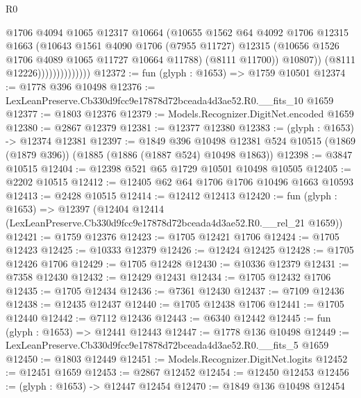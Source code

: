 \begin{lexlean}{R0}
\begin{coremodule}
                                @1706
                                @4094
                                @1065
                                @12317
                                @10664
                                (@10655
                                  @1562
                                  @64
                                  @4092
                                  @1706
                                  @12315
                                  @1663
                                  (@10643
                                    @1561
                                    @4090
                                    @1706
                                    (@7955 @11727)
                                    @12315
                                    (@10656 @1526 @1706 @4089 @1065 @11727 @10664 @11788)
                                    (@8111 @11700))
                                  @10807))
                              (@8111 @12226))))))))))))))
@12372 := fun (glyph : @1653) => @1759 @10501
@12374 := @1778 @396 @10498
@12376 := LexLeanPreserve.Cb330d9fcc9e17878d72bceada4d3ae52.R0.__fits_10 @1659
@12377 := @1803 @12376
@12379 := Models.Recognizer.DigitNet.encoded @1659
@12380 := @2867 @12379
@12381 := @12377 @12380
@12383 := (glyph : @1653) -> @12374 @12381
@12397 := @1849
    @396
    @10498
    @12381
    @524
    @10515
    (@1869 (@1879 @396))
    (@1885 (@1886 (@1887 @524) @10498 @1863))
@12398 := @3847 @10515
@12404 := @12398 @521 @65 @1729 @10501 @10498 @10505
@12405 := @2202 @10515
@12412 := @12405 @62 @64 @1706 @1706 @10496 @1663 @10593
@12413 := @2428 @10515
@12414 := @12412 @12413
@12420 := fun (glyph : @1653) =>
  @12397 (@12404 @12414 (LexLeanPreserve.Cb330d9fcc9e17878d72bceada4d3ae52.R0.__rel_21 @1659))
@12421 := @1759 @12376
@12423 := @1705 @12421 @1706
@12424 := @1705 @12423
@12425 := @10333 @12379
@12426 := @12424 @12425
@12428 := @1705 @12426 @1706
@12429 := @1705 @12428
@12430 := @10336 @12379
@12431 := @7358 @12430
@12432 := @12429 @12431
@12434 := @1705 @12432 @1706
@12435 := @1705 @12434
@12436 := @7361 @12430
@12437 := @7109 @12436
@12438 := @12435 @12437
@12440 := @1705 @12438 @1706
@12441 := @1705 @12440
@12442 := @7112 @12436
@12443 := @6340 @12442
@12445 := fun (glyph : @1653) => @12441 @12443
@12447 := @1778 @136 @10498
@12449 := LexLeanPreserve.Cb330d9fcc9e17878d72bceada4d3ae52.R0.__fits_5 @1659
@12450 := @1803 @12449
@12451 := Models.Recognizer.DigitNet.logits
@12452 := @12451 @1659
@12453 := @2867 @12452
@12454 := @12450 @12453
@12456 := (glyph : @1653) -> @12447 @12454
@12470 := @1849
    @136
    @10498
    @12454

\end{coremodule}
\end{lexlean}
